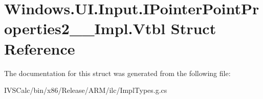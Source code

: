 \hypertarget{struct_windows_1_1_u_i_1_1_input_1_1_i_pointer_point_properties2_____impl_1_1_vtbl}{}\section{Windows.\+U\+I.\+Input.\+I\+Pointer\+Point\+Properties2\+\_\+\+\_\+\+Impl.\+Vtbl Struct Reference}
\label{struct_windows_1_1_u_i_1_1_input_1_1_i_pointer_point_properties2_____impl_1_1_vtbl}


The documentation for this struct was generated from the following file\+:\begin{DoxyCompactItemize}
\item 
I\+V\+S\+Calc/bin/x86/\+Release/\+A\+R\+M/ilc/Impl\+Types.\+g.\+cs\end{DoxyCompactItemize}

